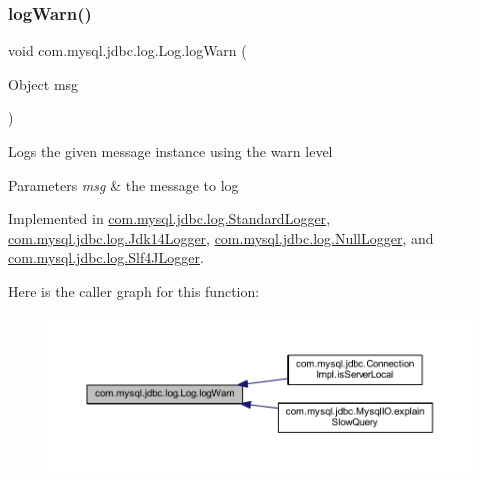 \mbox{\label{interfacecom_1_1mysql_1_1jdbc_1_1log_1_1_log_aa37a430b8cd7d66bb3ff46cb87e060f3}} 
\subsubsection{\texorpdfstring{log\+Warn()}{logWarn()}\hspace{0.1cm}{\footnotesize\ttfamily [1/2]}}
{\footnotesize\ttfamily void com.\+mysql.\+jdbc.\+log.\+Log.\+log\+Warn (\begin{DoxyParamCaption}\item[{Object}]{msg }\end{DoxyParamCaption})}

Logs the given message instance using the \textquotesingle{}warn\textquotesingle{} level


\begin{DoxyParams}{Parameters}
{\em msg} & the message to log \\
\hline
\end{DoxyParams}


Implemented in \mbox{\hyperlink{classcom_1_1mysql_1_1jdbc_1_1log_1_1_standard_logger_ab3a9b575254066c47662dd8489047afb}{com.\+mysql.\+jdbc.\+log.\+Standard\+Logger}}, \mbox{\hyperlink{classcom_1_1mysql_1_1jdbc_1_1log_1_1_jdk14_logger_aabfcbedefd9337d8f67f28a2c4a2a3ff}{com.\+mysql.\+jdbc.\+log.\+Jdk14\+Logger}}, \mbox{\hyperlink{classcom_1_1mysql_1_1jdbc_1_1log_1_1_null_logger_a044427d312493d8d18be0033d2451d36}{com.\+mysql.\+jdbc.\+log.\+Null\+Logger}}, and \mbox{\hyperlink{classcom_1_1mysql_1_1jdbc_1_1log_1_1_slf4_j_logger_a8b048f288f99466e1c687c84a472dca2}{com.\+mysql.\+jdbc.\+log.\+Slf4\+J\+Logger}}.

Here is the caller graph for this function\+:
\nopagebreak
\begin{figure}[H]
\begin{center}
\leavevmode
\includegraphics[width=350pt]{interfacecom_1_1mysql_1_1jdbc_1_1log_1_1_log_aa37a430b8cd7d66bb3ff46cb87e060f3_icgraph}
\end{center}
\end{figure}
\mbox{\label{interfacecom_1_1mysql_1_1jdbc_1_1log_1_1_log_a04d875e95d9a1d35f305da5ca20219a3}} 
